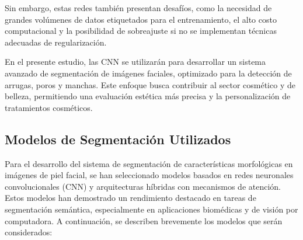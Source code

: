 Sin embargo, estas redes también presentan desafíos, como la necesidad de grandes volúmenes de datos etiquetados para el entrenamiento, el alto costo computacional y la posibilidad de sobreajuste si no se implementan técnicas adecuadas de regularización.

En el presente estudio, las CNN se utilizarán para desarrollar un sistema avanzado de segmentación de imágenes faciales, optimizado para la detección de arrugas, poros y manchas. Este enfoque busca contribuir al sector cosmético y de belleza, permitiendo una evaluación estética más precisa y la personalización de tratamientos cosméticos.


\subsection{Modelos de Segmentación Utilizados}

Para el desarrollo del sistema de segmentación de características morfológicas en imágenes de piel facial, se han seleccionado modelos basados en redes neuronales convolucionales (CNN) y arquitecturas híbridas con mecanismos de atención. Estos modelos han demostrado un rendimiento destacado en tareas de segmentación semántica, especialmente en aplicaciones biomédicas y de visión por computadora. A continuación, se describen brevemente los modelos que serán considerados:


